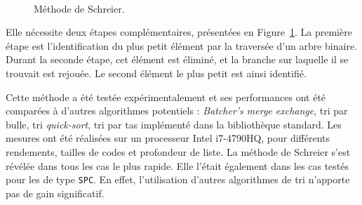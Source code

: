\begin{figure}[t]
\centering
{}
\\
\caption{Méthode de Schreier.}
\label{fig:schreier_sort}
\end{figure}
Elle nécessite deux étapes complémentaires, présentées en Figure~\ref{fig:schreier_sort}. La première étape est l'identification du plus petit élément par la traversée d'un arbre binaire. Durant la seconde étape, cet élément est éliminé, et la branche sur laquelle il se trouvait est rejouée. Le second élément le plus petit est ainsi identifié.


Cette méthode a été testée expérimentalement et ses performances ont été comparées à d'autres algorithmes potentiels : \textit{Batcher's merge exchange}, tri par bulle, tri \textit{quick-sort}, tri par tas implémenté dans la bibliothèque standard. Les mesures ont été réalisées sur un processeur Intel i7-4790HQ, pour différents rendements, tailles de codes et profondeur de liste. La méthode de Schreier s'est révélée dans tous les cas le plus rapide. Elle l'était également dans les cas testés pour les \noeuds de type \texttt{SPC}. En effet, l'utilisation d'autres algorithmes de tri n'apporte pas de gain significatif.

